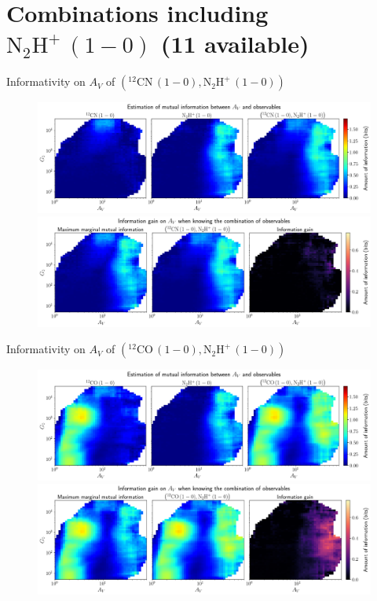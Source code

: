 \documentclass{beamer}
\begin{document}
\section{Combinations including $\mathrm{N_2H^+\,(1-0)}$ (11 available)}

\begin{frame}{Informativity on $A_V$ of $\left(\mathrm{^{12}CN\,(1-0)},\mathrm{N_2H^+\,(1-0)}\right)$}
    \begin{figure}
        \centering
        \includegraphics[width=0.95\linewidth]{../mi/av__12cn10_n2hp10_mi.png}
        \vfill
        \includegraphics[width=0.95\linewidth]{../mi/av__12cn10_n2hp10_mi_gain.png}
    \end{figure}
\end{frame}

\begin{frame}{Informativity on $A_V$ of $\left(\mathrm{^{12}CO\,(1-0)},\mathrm{N_2H^+\,(1-0)}\right)$}
    \begin{figure}
        \centering
        \includegraphics[width=0.95\linewidth]{../mi/av__12co10_n2hp10_mi.png}
        \vfill
        \includegraphics[width=0.95\linewidth]{../mi/av__12co10_n2hp10_mi_gain.png}
    \end{figure}
\end{frame}
\end{document}
